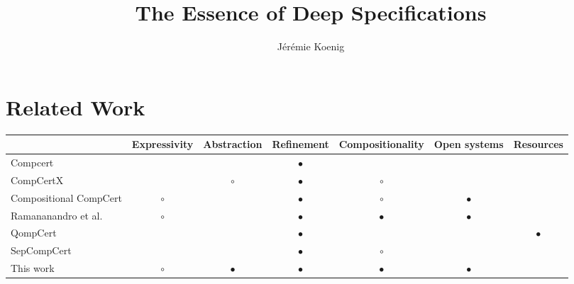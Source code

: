 \documentclass[sigplan,10pt,review,anonymous]{acmart}
\begin{document}
\title{%
  The Essence of Deep Specifications
}

\author{J\'er\'emie Koenig}

\begin{abstract} %
\end{abstract}

\maketitle





\section{Related Work} %

\begin{table*}
  \begin{tabular}{lcccccc}
    \hline
    & Expressivity & Abstraction & Refinement & Compositionality & Open systems & Resources \\
    \hline
    Compcert \cite{compcert}
      &           &           & $\bullet$ &           &           & \\
    CompCertX \cite{popl2015}
      &           & $\circ$   & $\bullet$ & $\circ$   &           & \\
    Compositional CompCert \cite{compcompcert}
      & $\circ$   &           & $\bullet$ & $\circ$   & $\bullet$ & \\
    Ramananandro et al. \cite{cpp2015}
      & $\circ$   &           & $\bullet$ & $\bullet$ & $\bullet$ & \\
    QompCert \cite{qompcert}
      &           &           & $\bullet$ &           &           & $\bullet$ \\
    SepCompCert \cite{lwsc}
      &           &           & $\bullet$ & $\circ$   &           & \\
    This work
      & $\circ$   & $\bullet$ & $\bullet$ & $\bullet$ & $\bullet$ & \\
    \hline
  \end{tabular}
\end{table*}



\end{document}
